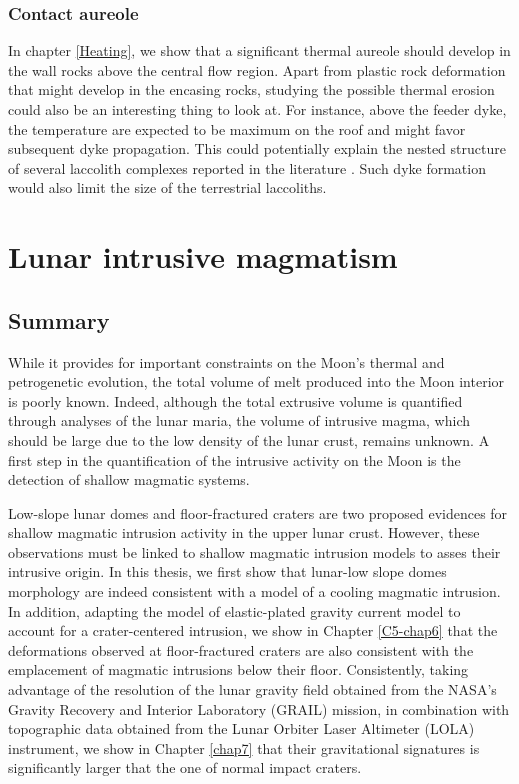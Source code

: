 \subsubsection*{Contact aureole}

In chapter \ref{Heating},  we show that a  significant thermal aureole
should develop in the wall rocks above the central flow region.  Apart
from  plastic rock  deformation  that might  develop  in the  encasing
rocks,  studying  the  possible  thermal  erosion  could  also  be  an
interesting thing to look at. For instance, above the feeder dyke, the
temperature are  expected to be  maximum on  the roof and  might favor
subsequent dyke propagation. This could potentially explain the nested
structure of  several laccolith  complexes reported in  the literature
\citep{E:2015tl,Rocchi:2010dn}. Such  dyke formation would  also limit
the size of the terrestrial laccoliths.

\section{Lunar intrusive magmatism}

\subsection{Summary}
\label{sec:summary-1}

While it provides for important  constraints on the Moon's thermal and
petrogenetic evolution,  the total  volume of  melt produced  into the
Moon interior is  poorly known.  Indeed, although  the total extrusive
volume is quantified  through analyses of the lunar  maria, the volume
of intrusive  magma, which should be  large due to the  low density of
the lunar crust,  remains unknown. A first step  in the quantification
of the  intrusive activity  on the  Moon is  the detection  of shallow
magmatic systems.

Low-slope  lunar domes  and floor-fractured  craters are  two proposed
evidences for shallow  magmatic intrusion activity in  the upper lunar
crust. However, these observations must  be linked to shallow magmatic
intrusion models to asses their  intrusive origin.  In this thesis, we
first show that lunar-low slope domes morphology are indeed consistent
with a model  of a cooling magmatic intrusion.   In addition, adapting
the model  of elastic-plated  gravity current model  to account  for a
crater-centered intrusion, we show  in Chapter \ref{C5-chap6} that the
deformations observed  at floor-fractured craters are  also consistent
with  the  emplacement  of  magmatic  intrusions  below  their  floor.
Consistently, taking advantage of the  resolution of the lunar gravity
field  obtained   from  the  NASA’s  Gravity   Recovery  and  Interior
Laboratory  (GRAIL)  mission,  in combination  with  topographic  data
obtained from the Lunar Orbiter  Laser Altimeter (LOLA) instrument, we
show  in Chapter  \ref{chap7} that  their gravitational  signatures is
significantly larger that the one of normal impact craters.

